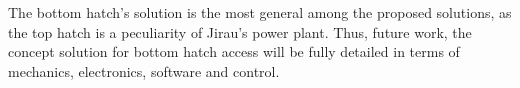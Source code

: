 The bottom hatch's solution is the most general among the proposed
solutions, as the top hatch is a peculiarity of Jirau's power plant. Thus,
future work, the concept solution for bottom hatch access will be fully
detailed in terms of mechanics, electronics, software and control.



